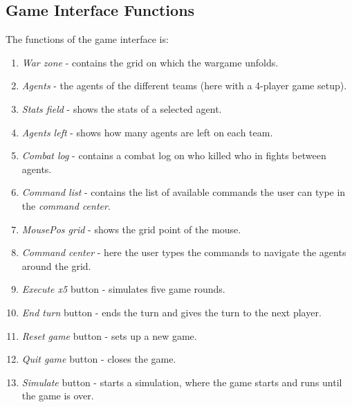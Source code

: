 \subsection*{Game Interface Functions}
The functions of the game interface is:
\begin{enumerate}
	\item \textit{War zone} - contains the grid on which the wargame unfolds.
	\item \textit{Agents} - the agents of the different teams (here with a 4-player game setup).
	\item \textit{Stats field} - shows the stats of a selected agent.
	\item \textit{Agents left} - shows how many agents are left on each team.
	\item \textit{Combat log} - contains a combat log on who killed who in fights between agents.
	\item \textit{Command list} - contains the list of available commands the user can type in the \textit{command center}.
	\item \textit{MousePos grid} - shows the grid point of the mouse.
	\item \textit{Command center} - here the user types the commands to navigate the agents around the grid.
	\item \textit{Execute x5} button - simulates five game rounds.
	\item \textit{End turn} button - ends the turn and gives the turn to the next player.
	\item \textit{Reset game} button - sets up a new game.
	\item \textit{Quit game} button - closes the game.
	\item \textit{Simulate} button - starts a simulation, where the game starts and runs until the game is over.
\end{enumerate}

